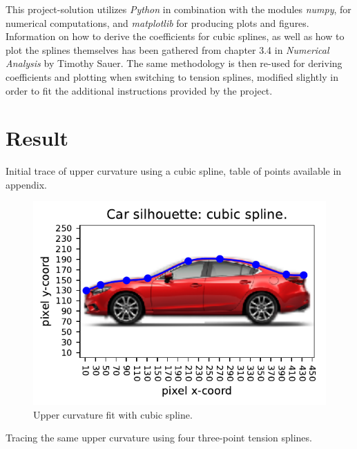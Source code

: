 \documentclass{article}
\newcommand{\T}[2]{\textbf{Task #1} -- #2:\\}
\begin{document}
  This project-solution utilizes \textit{Python} in combination with the
  modules \textit{numpy}, for numerical computations, and \textit{matplotlib}
  for producing plots and figures. \\

  Information on how to derive the coefficients for cubic splines, as well as
  how to plot the splines themselves has been gathered from chapter 3.4 in
  \textit{Numerical Analysis} by Timothy Sauer.  The same methodology is then
  re-used for deriving coefficients and plotting when switching to tension
  splines, modified slightly in order to fit the additional instructions
  provided by the project.

\section*{Result}


  Initial trace of upper curvature using a cubic spline, table of points
  available in appendix.

  \begin{figure}[!h]
    \center
    \includegraphics{figs/p2-car-grid-cubic.pdf}
    \caption{Upper curvature fit with cubic spline.}
  \end{figure}

  Tracing the same upper curvature using four three-point tension splines.
\end{document}
